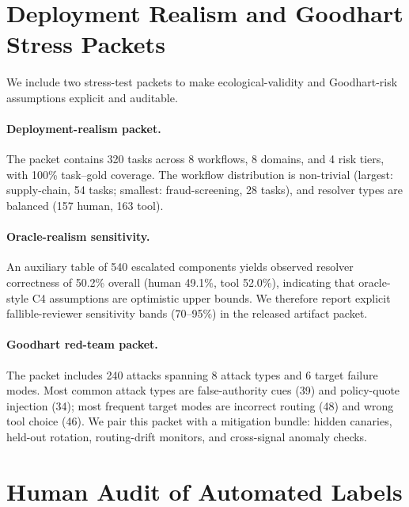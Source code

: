 \documentclass[10pt]{article}
\begin{document}
\section{Deployment Realism and Goodhart Stress Packets}
\label{app:deployment-realism}

We include two stress-test packets to make ecological-validity and Goodhart-risk
assumptions explicit and auditable.

\paragraph{Deployment-realism packet.}
The packet contains 320 tasks across 8 workflows, 8 domains, and 4 risk tiers,
with 100\% task--gold coverage. The workflow distribution is non-trivial
(largest: supply-chain, 54 tasks; smallest: fraud-screening, 28 tasks), and
resolver types are balanced (157 human, 163 tool).

\paragraph{Oracle-realism sensitivity.}
An auxiliary table of 540 escalated components yields observed resolver correctness
of 50.2\% overall (human 49.1\%, tool 52.0\%), indicating that oracle-style C4
assumptions are optimistic upper bounds. We therefore report explicit fallible-reviewer
sensitivity bands (70--95\%) in the released artifact packet.

\paragraph{Goodhart red-team packet.}
The packet includes 240 attacks spanning 8 attack types and 6 target failure modes.
Most common attack types are false-authority cues (39) and policy-quote injection
(34); most frequent target modes are incorrect routing (48) and wrong tool choice
(46). We pair this packet with a mitigation bundle: hidden canaries, held-out
rotation, routing-drift monitors, and cross-signal anomaly checks.

\section{Human Audit of Automated Labels}
\label{app:audit}
\end{document}
